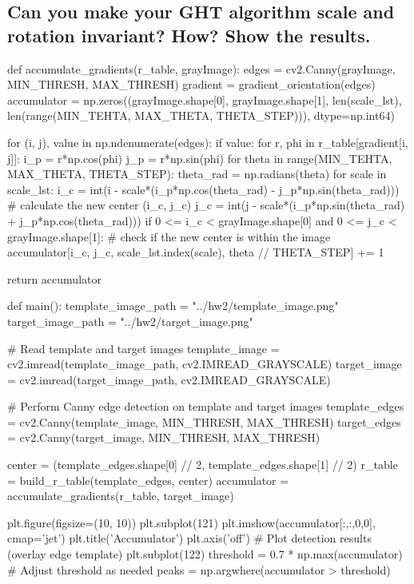 \documentclass[10pt]{article}
\begin{document}
\subsection*{Can you make your GHT algorithm scale and rotation invariant? How? Show the results.}

\begin{python}

def accumulate_gradients(r_table, grayImage):
    edges = cv2.Canny(grayImage, MIN_THRESH, MAX_THRESH)
    gradient = gradient_orientation(edges)
    accumulator = np.zeros((grayImage.shape[0], grayImage.shape[1], len(scale_lst), len(range(MIN_TEHTA, MAX_THETA, THETA_STEP))), dtype=np.int64)

    for (i, j), value in np.ndenumerate(edges):
        if value:
            for r, phi in r_table[gradient[i, j]]:
                i_p = r*np.cos(phi)
                j_p = r*np.sin(phi)
                for theta in range(MIN_TEHTA, MAX_THETA, THETA_STEP):
                    theta_rad = np.radians(theta)
                    for scale in scale_lst:
                        i_c = int(i - scale*(i_p*np.cos(theta_rad) - j_p*np.sin(theta_rad)))  # calculate the new center (i_c, j_c)
                        j_c = int(j - scale*(i_p*np.sin(theta_rad) + j_p*np.cos(theta_rad)))
                        if 0 <= i_c < grayImage.shape[0] and 0 <= j_c < grayImage.shape[1]:  # check if the new center is within the image
                            accumulator[i_c, j_c, scale_lst.index(scale), theta // THETA_STEP] += 1

    return accumulator

def main():
    template_image_path = "../hw2/template_image.png"
    target_image_path = "../hw2/target_image.png"

    # Read template and target images
    template_image = cv2.imread(template_image_path, cv2.IMREAD_GRAYSCALE)
    target_image = cv2.imread(target_image_path, cv2.IMREAD_GRAYSCALE)

    # Perform Canny edge detection on template and target images
    template_edges = cv2.Canny(template_image,  MIN_THRESH, MAX_THRESH)
    target_edges = cv2.Canny(target_image,  MIN_THRESH, MAX_THRESH)

    center = (template_edges.shape[0] // 2, template_edges.shape[1] // 2)
    r_table = build_r_table(template_edges, center)
    accumulator = accumulate_gradients(r_table, target_image)

    plt.figure(figsize=(10, 10))
    plt.subplot(121)
    plt.imshow(accumulator[:,:,0,0], cmap='jet')
    plt.title('Accumulator')
    plt.axis('off')
    # Plot detection results (overlay edge template)
    plt.subplot(122)
    threshold = 0.7 * np.max(accumulator)  # Adjust threshold as needed
    peaks = np.argwhere(accumulator > threshold)


\end{python}
\end{document}
